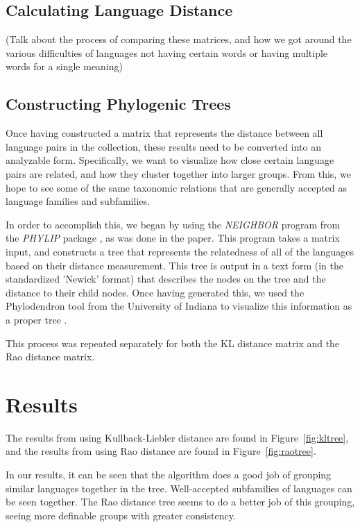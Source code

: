 \documentclass[10pt,a4]{article}
\begin{document}
\subsection{Calculating Language Distance}

(Talk about the process of comparing these matrices, and how we got around the various difficulties of languages not having certain words or having multiple words for a single meaning)

\subsection{Constructing Phylogenic Trees}

Once having constructed a matrix that represents the distance between all language pairs in the collection, these results need to be converted into an analyzable form.  Specifically, we want to visualize how close certain language pairs are related, and how they cluster together into larger groups.  From this, we hope to see some of the same taxonomic relations that are generally accepted as language families and subfamilies.

In order to accomplish this, we began by using the \textit{NEIGHBOR} program from the \textit{PHYLIP} package \cite{web:phylip}, as was done in the paper.  This program takes a matrix input, and constructs a tree that represents the relatedness of all of the languages based on their distance measurement.  This tree is output in a text form (in the standardized 'Newick' format) that describes the nodes on the tree and the distance to their child nodes.  Once having generated this, we used the Phylodendron tool from the University of Indiana to visualize this information as a proper tree \cite{web:phylodendron}.  

This process was repeated separately for both the KL distance matrix and the Rao distance matrix.

\section{Results}
	
The results from using Kullback-Liebler distance are found in Figure~\ref{fig:kltree}, and the results from using Rao distance are found in Figure~\ref{fig:raotree}.

In our results, it can be seen that the algorithm does a good job of grouping similar languages together in the tree.  Well-accepted subfamilies of languages can be seen together.  The Rao distance tree seems to do a better job of this grouping, seeing more definable groups with greater consistency.
\end{document}
